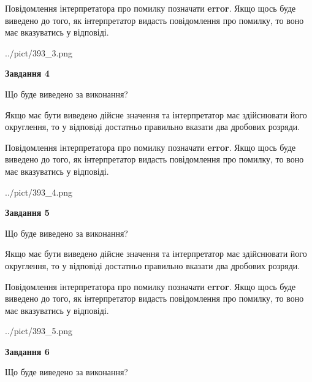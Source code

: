 \documentclass[12pt, ukrainian]{article}
\begin{document}
{\begin {Large}
Повідомлення інтерпретатора про помилку позначати \textbf{error}.
Якщо щось буде виведено до того, як інтерпретатор видасть повідомлення про помилку, 
то воно має вказуватись у відповіді. \par

\begin{center}
	{../pict/393_3.png}
\end{center}
\newpage

{\begin {center}\textbf{Завдання 4}\end {center}}\par
Що буде виведено за виконання? \par

Якщо має бути виведено дійсне значення та інтерпретатор має здійснювати його округлення, 
то у відповіді достатньо правильно вказати два дробових розряди.

Повідомлення інтерпретатора про помилку позначати \textbf{error}.
Якщо щось буде виведено до того, як інтерпретатор видасть повідомлення про помилку, 
то воно має вказуватись у відповіді. \par

\begin{center}
	{../pict/393_4.png}
\end{center}
\newpage

{\begin {center}\textbf{Завдання 5}\end {center}}\par
Що буде виведено за виконання? \par

Якщо має бути виведено дійсне значення та інтерпретатор має здійснювати його округлення, 
то у відповіді достатньо правильно вказати два дробових розряди.

Повідомлення інтерпретатора про помилку позначати \textbf{error}.
Якщо щось буде виведено до того, як інтерпретатор видасть повідомлення про помилку, 
то воно має вказуватись у відповіді. \par

\begin{center}
	{../pict/393_5.png}
\end{center}
\newpage

{\begin {center}\textbf{Завдання 6}\end {center}}\par
Що буде виведено за виконання? \par


\end{Large}}
\end{document}
